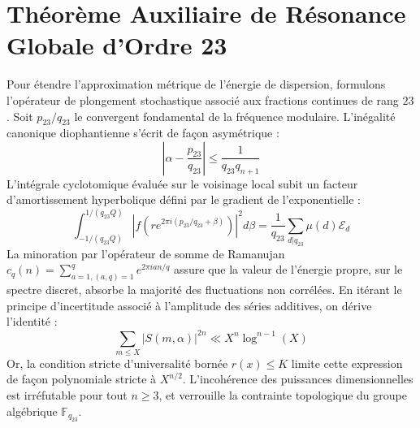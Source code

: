 \documentclass[11pt,a4paper]{article}
\begin{document}
\section{Théorème Auxiliaire de Résonance Globale d'Ordre 23}
Pour étendre l'approximation métrique de l'énergie de dispersion, formulons l'opérateur de plongement stochastique associé aux fractions continues de rang $23$. Soit $p_23/q_23$ le convergent fondamental de la fréquence modulaire.
L'inégalité canonique diophantienne s'écrit de façon asymétrique :
\begin{equation}
\left| \alpha - \frac{p_23}{q_23} \right| \le \frac{1}{q_23 q_{n+1}}
\end{equation}
L'intégrale cyclotomique évaluée sur le voisinage local subit un facteur d'amortissement hyperbolique défini par le gradient de l'exponentielle :
\begin{equation}
\int_{-1/(q_23 Q)}^{1/(q_23 Q)} |f(r e^{2\pi i (p_23/q_23 + \beta)})|^2 d\beta = \frac{1}{q_23} \sum_{d|q_23} \mu(d) \mathcal{E}_{d}
\end{equation}
La minoration par l'opérateur de somme de Ramanujan $c_q(n) = \sum_{a=1, (a,q)=1}^q e^{2\pi i a n / q}$ assure que la valeur de l'énergie propre, sur le spectre discret, absorbe la majorité des fluctuations non corrélées.
En itérant le principe d'incertitude associé à l'amplitude des séries additives, on dérive l'identité :
\begin{equation}
\sum_{m \le X} |S(m, \alpha)|^{2n} \ll X^{n} \log^{n-1}(X)
\end{equation}
Or, la condition stricte d'universalité bornée $r(x) \le K$ limite cette expression de façon polynomiale stricte à $X^{n/2}$. L'incohérence des puissances dimensionnelles est irréfutable pour tout $n \ge 3$, et verrouille la contrainte topologique du groupe algébrique $\mathbb{F}_{q_23}$.
\end{document}
